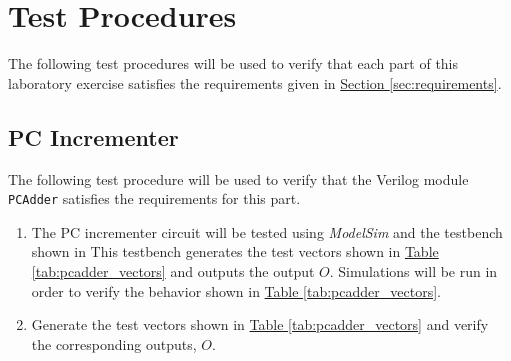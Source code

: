 \section{Test Procedures} %
\label{sec:test_procedures}

The following test procedures will be used to verify that each part of this laboratory exercise satisfies the requirements given in \hyperref[sec:requirements]{Section \ref*{sec:requirements}}.

\subsection{PC Incrementer} %
\label{sub:pc_incrementer}

The following test procedure will be used to verify that the Verilog module \verb|PCAdder| satisfies the requirements for this part.

\begin{enumerate}
    \item The PC incrementer circuit will be tested using \emph{ModelSim} and the testbench shown in %
    This testbench generates the test vectors shown in \hyperref[tab:pcadder_vectors]{Table \ref*{tab:pcadder_vectors}} and outputs the output $O$.
    Simulations will be run in order to verify the behavior shown in \hyperref[tab:pcadder_vectors]{Table \ref*{tab:pcadder_vectors}}.
    \item Generate the test vectors shown in \hyperref[tab:pcadder_vectors]{Table \ref*{tab:pcadder_vectors}} and verify the corresponding outputs, $O$.
\end{enumerate}

